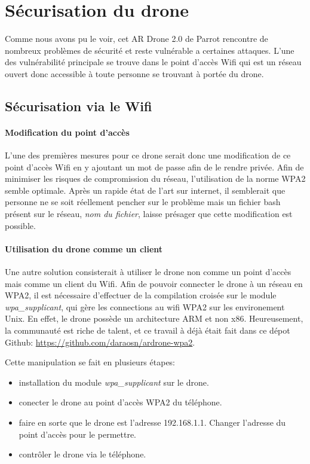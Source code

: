 \section{Sécurisation du drone}
Comme nous avons pu le voir, cet AR Drone 2.0 de Parrot rencontre de nombreux problèmes de sécurité et reste vulnérable a certaines attaques. L'une des vulnérabilité principale se trouve dans le point d'accès Wifi qui est un réseau ouvert donc accessible à toute personne se trouvant à portée du drone.

\subsection{Sécurisation via le Wifi}
\paragraph{Modification du point d'accès}
L'une des premières mesures pour ce drone serait donc une modification de ce point d'accès Wifi en y ajoutant un mot de passe afin de le rendre privée. Afin de minimiser les risques de compromission du réseau, l'utilisation de la norme WPA2 semble optimale. Après un rapide état de l'art sur internet, il semblerait que personne ne se soit réellement pencher sur le problème mais un fichier bash présent sur le réseau, \textit{nom du fichier}, laisse présager que cette modification est possible.

\paragraph{Utilisation du drone comme un client}
Une autre solution consisterait à utiliser le drone non comme un point d'accès mais comme un client du Wifi.
Afin de pouvoir connecter le drone à un réseau en WPA2, il est nécessaire d'effectuer de la compilation croisée sur le module \textit{wpa\_supplicant}, qui gère les connections au wifi WPA2 sur les environement Unix. En effet, le drone possède un architecture ARM et non x86. Heureusement, la communauté est riche de talent, et ce travail à déjà était fait dans ce dépot Github: \url{https://github.com/daraosn/ardrone-wpa2}.

Cette manipulation se fait en plusieurs étapes:
\begin{itemize}
  \item installation du module \textit{wpa\_supplicant} sur le drone.
  \item conecter le drone au point d'accès WPA2 du téléphone.
  \item faire en sorte que le drone est l'adresse 192.168.1.1. Changer l'adresse du point d'accès pour le permettre.
  \item contrôler le drone via le téléphone.
\end{itemize}

